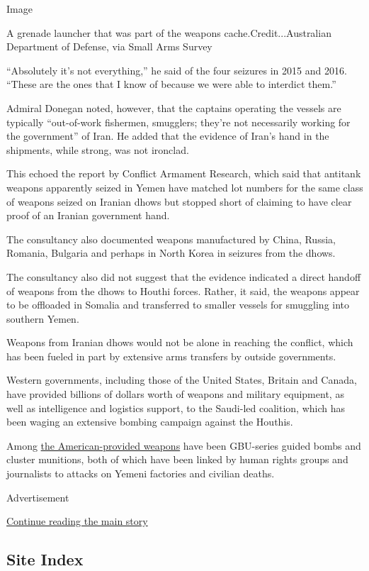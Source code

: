 Image

A grenade launcher that was part of the weapons
cache.Credit...Australian Department of Defense, via Small Arms Survey

``Absolutely it's not everything,'' he said of the four seizures in 2015
and 2016. ``These are the ones that I know of because we were able to
interdict them.''

Admiral Donegan noted, however, that the captains operating the vessels
are typically ``out-of-work fishermen, smugglers; they're not
necessarily working for the government'' of Iran. He added that the
evidence of Iran's hand in the shipments, while strong, was not
ironclad.

This echoed the report by Conflict Armament Research, which said that
antitank weapons apparently seized in Yemen have matched lot numbers for
the same class of weapons seized on Iranian dhows but stopped short of
claiming to have clear proof of an Iranian government hand.

The consultancy also documented weapons manufactured by China, Russia,
Romania, Bulgaria and perhaps in North Korea in seizures from the dhows.

The consultancy also did not suggest that the evidence indicated a
direct handoff of weapons from the dhows to Houthi forces. Rather, it
said, the weapons appear to be offloaded in Somalia and transferred to
smaller vessels for smuggling into southern Yemen.

Weapons from Iranian dhows would not be alone in reaching the conflict,
which has been fueled in part by extensive arms transfers by outside
governments.

Western governments, including those of the United States, Britain and
Canada, have provided billions of dollars worth of weapons and military
equipment, as well as intelligence and logistics support, to the
Saudi-led coalition, which has been waging an extensive bombing campaign
against the Houthis.

Among
\href{https://www.nytimes3xbfgragh.onion/2016/11/14/world/middleeast/yemen-saudi-bombing-houthis-hunger.html?_r=0}{the
American-provided weapons} have been GBU-series guided bombs and cluster
munitions, both of which have been linked by human rights groups and
journalists to attacks on Yemeni factories and civilian deaths.

Advertisement

\protect\hyperlink{after-bottom}{Continue reading the main story}

\hypertarget{site-index}{%
\subsection{Site Index}\label{site-index}}

